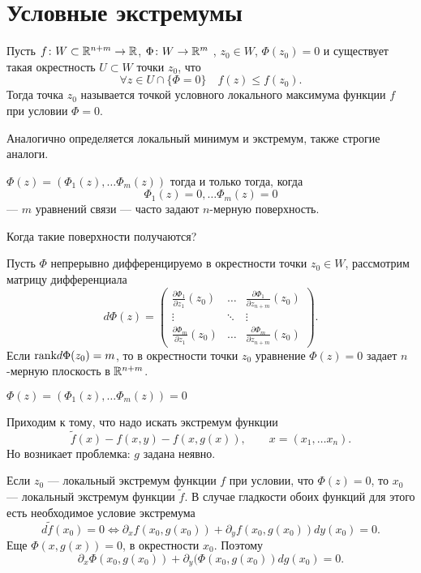 % 
% 
%
\section{Условные экстремумы}
\begin{defn}
    Пусть $ f\colon W \subset \mathbb{R}^{n+m} \to  \mathbb{R}$, $ \Phi\colon W \to  \mathbb{R}^{m} $ , $ z_0 \in W$, $ \Phi(z_0) = 0$ и существует такая окрестность $ U \subset W$ точки $ z_0$, что
    \[
	\forall z \in U \cap \{\Phi = 0\} \quad f(z) \le f(z_0)
    .\] 
    Тогда точка $ z_0$ называется {\sf точкой условного локального максимума} функции $ f$ при условии $ \Phi = 0$.  
\end{defn}
\begin{note}
    Аналогично определяется локальный минимум и экстремум, также строгие аналоги.
\end{note}
\begin{note}
    $ \Phi(z) = \left(\Phi_1(z), \ldots \Phi_m(z)\right)  $ тогда и только тогда, когда 
    \[
	\Phi_1(z) = 0, \ldots \Phi_m(z) = 0
    \] 
    --- $ m$ уравнений связи --- часто задают  $ n$-мерную поверхность.
\end{note}
Когда такие поверхности получаются?

Пусть $ \Phi$ непрерывно дифференцируемо в окрестности точки  $ z_0 \in W$, рассмотрим матрицу дифференциала
\[
    d\Phi (z) = 
    \begin{pmatrix}
	\frac{\partial \Phi_1}{\partial z_1}(z_0) & \ldots & \frac{\partial \Phi_1}{\partial z_{n+m}}(z_0) \\
	\vdots & \ddots & \vdots \\
	\frac{\partial \Phi_m}{\partial z_1}(z_0) & \ldots & \frac{\partial \Phi_m}{\partial z_{n+m}}(z_0)
    \end{pmatrix}
.\] 
Если $ {\mathop{\text{\rm rank}}} d\Phi(z_0) = m$, то в окрестности точки $ z_0$ уравнение $ \Phi(z) = 0$ задает  $ n$-мерную плоскость в  $ \mathbb{R}^{n+m}$.

\begin{note}
    $ \Phi(z) = \left( \Phi_1(z), \ldots \Phi_m(z) \right)  = 0$
\end{note}

Приходим к тому, что надо искать экстремум функции
\[
    \tilde f(x) - f(x, y) - f(x, g(x)), \qquad  x = (x_1, \ldots x_{n})
.\] 
Но возникает проблемка: $ g$ задана неявно.

Если  $ z_0$ --- локальный экстремум функции $ f$ при условии, что  $ \Phi(z) = 0$, то  $ x_0$ --- локальный экстремум функции $ \tilde f$. В случае гладкости обоих функций для этого есть необходимое условие экстремума
  \[
      d \tilde f(x_0) = 0 \Longleftrightarrow \partial _x f(x_0, g(x_0)) + \partial _yf(x_0, g(x_0)) dy(x_0) = 0
 .\] 
 Еще $ \Phi(x, g(x)) = 0$, в окрестности $ x_0$. Поэтому 
 \[
     \partial _x \Phi(x_0, g(x_0)) + \partial _y(\Phi(x_0, g(x_0))dg(x_0) = 0
 .\] 

